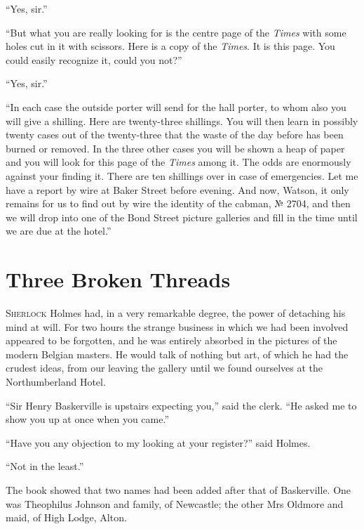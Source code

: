 \documentclass[paper=5.5in:8.5in,BCOR=7mm,twoside,DIV=calc,12pt,usegeometry,openany,chapterprefix,endperiod]{scrbook} %
\begin{document}
\enquote{Yes, sir.}

\enquote{But what you are really looking for is the centre page of the \textit{Times} with some holes cut in it with scissors. Here is a copy of the \textit{Times}. It is this page. You could easily recognize it, could you not?}

\enquote{Yes, sir.}

\enquote{In each case the outside porter will send for the hall porter, to whom also you will give a shilling. Here are twenty-three shillings. You will then learn in possibly twenty cases out of the twenty-three that the waste of the day before has been burned or removed. In the three other cases you will be shown a heap of paper and you will look for this page of the \textit{Times} among it. The odds are enormously against your finding it. There are ten shillings over in case of emergencies. Let me have a report by wire at Baker Street before evening. And now, Watson, it only remains for us to find out by wire the identity of 
the cabman, № 2704, and then we will drop into one of the Bond Street picture galleries and fill in the time until we are due at the hotel.}


\chapter{Three Broken Threads}
\lettrine[lines=1]{S}{herlock} Holmes had, in a very remarkable degree, the power of detaching his mind at will. For two hours the strange business in which we had been involved appeared to be forgotten, and he was entirely absorbed in the pictures of the modern Belgian masters. He would talk of nothing but art, of which he had the crudest ideas, from our leaving the gallery until we found ourselves at the Northumberland Hotel.

\enquote{Sir Henry Baskerville is upstairs expecting you,} said the clerk. \enquote{He asked me to show you up at once when you came.}

\enquote{Have you any objection to my looking at your register?} said Holmes.

\enquote{Not in the least.}

The book showed that two names had been added after that of Baskerville. One was Theophilus Johnson and family, of Newcastle; the other Mrs Oldmore and maid, of High Lodge, Alton.
\end{document}
